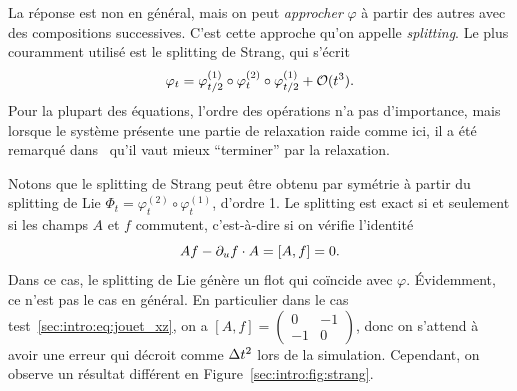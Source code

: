 La réponse est non en général, mais on peut \textit{approcher} $\varphi$ à partir des autres avec des compositions successives. C'est cette approche qu'on appelle \textit{splitting}. Le plus couramment utilisé est le splitting de Strang, qui s'écrit 
\begin{equation*}
    \varphi_t = \varphi^{(1)}_{t/2} \circ \varphi^{(2)}_{t} \circ \varphi^{(1)}_{t/2} + \mathcal{O}(t^3) .
\end{equation*}
Pour la plupart des équations, l'ordre des opérations n'a pas d'importance, mais lorsque le système présente une partie de relaxation raide comme ici, il a été remarqué dans~\cite{sportisse.2000.analysis,descombes.2004.operator} qu'il vaut mieux \enquote{terminer} par la relaxation. 

Notons que le splitting de Strang peut être obtenu par symétrie à partir du splitting de Lie $\Phi_t = \varphi^{(2)}_{t} \circ \varphi^{(1)}_{t}$, d'ordre 1. 
Le splitting est exact si et seulement si les champs $A$ et $f$ commutent, c'est-à-dire si on vérifie l'identité 
\begin{equation*}
    Af - \partial_u f \cdot A = [A,f] = 0 .
\end{equation*}
Dans ce cas, le splitting de Lie génère un flot qui coïncide avec $\varphi$. Évidemment, ce n'est pas le cas en général. En particulier dans le cas test~\eqref{sec:intro:eq:jouet_xz}, on a $[A,f] = \begin{pmatrix} 0 & -1 \\ -1 & 0 \end{pmatrix}$, donc on s'attend à avoir une erreur qui décroit comme $\Delta t^2$ lors de la simulation. Cependant, on observe un résultat différent en Figure~\ref{sec:intro:fig:strang}.


